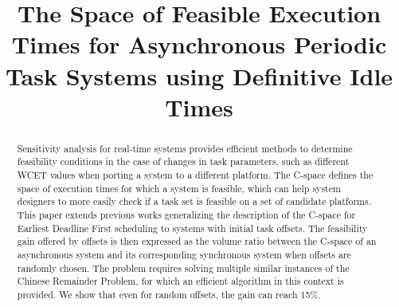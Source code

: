 \documentclass[conference]{IEEEtran}
\begin{document}
\title{The Space of Feasible Execution Times for Asynchronous Periodic Task
Systems using Definitive Idle Times}


\author{
\and
{}
\and
{}
}

\maketitle

\begin{abstract}
	Sensitivity analysis for real-time systems provides efficient methods to determine feasibility
	conditions in the case of changes in task parameters, such as
	different WCET values when porting a system to a different platform. The \mbox{C-space} defines the space of execution
	times for which a system is feasible, which can help system designers to more easily check
	if a task set is feasible on a set of candidate platforms. This paper extends previous works
	generalizing the description of the C-space for Earliest Deadline First
	scheduling to systems with initial task offsets. The feasibility gain offered
	by offsets is then expressed as the volume ratio between the C-space of an
	asynchronous system and its corresponding synchronous system when offsets are randomly chosen. The problem
	requires solving multiple similar instances of the Chinese Remainder Problem,
	for which an efficient algorithm in this context is provided. We show that even for random offsets, the gain can reach 15\%.
\end{abstract}

%
\end{document}
